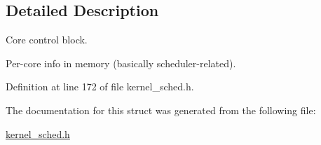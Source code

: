 \subsection{Detailed Description}
Core control block. 

Per-\/core info in memory (basically scheduler-\/related). 

Definition at line 172 of file kernel\+\_\+sched.\+h.



The documentation for this struct was generated from the following file\+:\begin{DoxyCompactItemize}
\item 
\hyperlink{kernel__sched_8h}{kernel\+\_\+sched.\+h}\end{DoxyCompactItemize}
